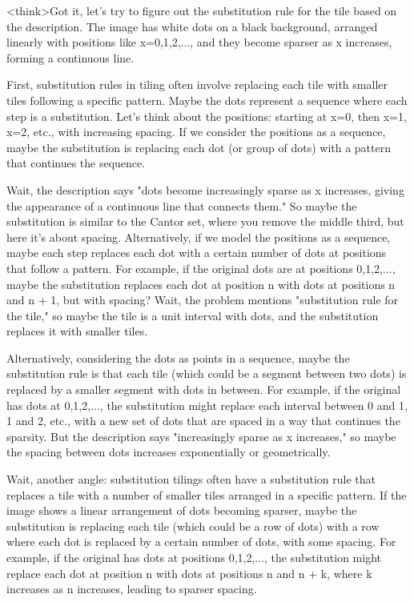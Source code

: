 <think>Got it, let's try to figure out the substitution rule for the tile based on the description. The image has white dots on a black background, arranged linearly with positions like x=0,1,2,..., and they become sparser as x increases, forming a continuous line. 

First, substitution rules in tiling often involve replacing each tile with smaller tiles following a specific pattern. Maybe the dots represent a sequence where each step is a substitution. Let's think about the positions: starting at x=0, then x=1, x=2, etc., with increasing spacing. If we consider the positions as a sequence, maybe the substitution is replacing each dot (or group of dots) with a pattern that continues the sequence. 

Wait, the description says "dots become increasingly sparse as x increases, giving the appearance of a continuous line that connects them." So maybe the substitution is similar to the Cantor set, where you remove the middle third, but here it's about spacing. Alternatively, if we model the positions as a sequence, maybe each step replaces each dot with a certain number of dots at positions that follow a pattern. For example, if the original dots are at positions 0,1,2,..., maybe the substitution replaces each dot at position n with dots at positions n and n + 1, but with spacing? Wait, the problem mentions "substitution rule for the tile," so maybe the tile is a unit interval with dots, and the substitution replaces it with smaller tiles. 

Alternatively, considering the dots as points in a sequence, maybe the substitution rule is that each tile (which could be a segment between two dots) is replaced by a smaller segment with dots in between. For example, if the original has dots at 0,1,2,..., the substitution might replace each interval between 0 and 1, 1 and 2, etc., with a new set of dots that are spaced in a way that continues the sparsity. But the description says "increasingly sparse as x increases," so maybe the spacing between dots increases exponentially or geometrically. 

Wait, another angle: substitution tilings often have a substitution rule that replaces a tile with a number of smaller tiles arranged in a specific pattern. If the image shows a linear arrangement of dots becoming sparser, maybe the substitution is replacing each tile (which could be a row of dots) with a row where each dot is replaced by a certain number of dots, with some spacing. For example, if the original has dots at positions 0,1,2,..., the substitution might replace each dot at position n with dots at positions n and n + k, where k increases as n increases, leading to sparser spacing. 


